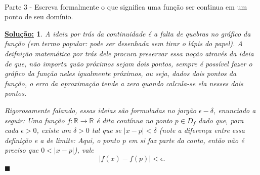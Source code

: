 \documentclass{article}
\newtheorem*{sol*}{\underline{Solu\c c\~ao:}}
\renewcommand\qedsymbol{$\blacksquare$}
\begin{document}
\paragraph{} Parte 3 - Escreva formalmente o que significa uma fun\c c\~ao ser con\'tinua em um ponto de seu dom\'inio.
\begin{sol*}
	A ideia por tr\'as da continuidade \'e a falta de quebras no gr\'afico da fun\c c\~ao (em termo popular: pode ser desenhada sem tirar o l\'apis do papel). A deifni\c c\~ao matem\'atica por tr\'as dele procura preservar essa no\c c\~ao atrav\'es da ideia de que, n\~ao importa qu\~ao pr\'oximos sejam dois pontos, sempre \'e poss\'ivel fazer o gr\'afico da fun\c c\~ao neles igualmente pr\'oximos, ou seja, dados dois pontos da fun\c c\~ao, o erro da aproxima\c c\~ao tende a zero quando calcula-se ela nesses dois pontos.

	Rigorosamente falando, essas ideias s\~ao formuladas no jarg\~ao $\epsilon-\delta$, enunciado a seguir: Uma fun\c c\~ao $f:\mathbb{R}\rightarrow\mathbb{R}$ \'e dita cont\'inua no ponto $p\in{D_{f}}$ dado que, para cada $\epsilon > 0$, existe um $\delta > 0$ tal que se $|x - p| < \delta$ (note a diferen\c ca entre essa defini\c c\~ao e a de limite: Aqui, o ponto p em si faz parte da conta, ent\~ao n\~ao \'e preciso que $0 < |x - p|$), vale
	$$
		|f(x) - f(p)| < \epsilon.
	$$
	\qedsymbol
\end{sol*}
\end{document}
